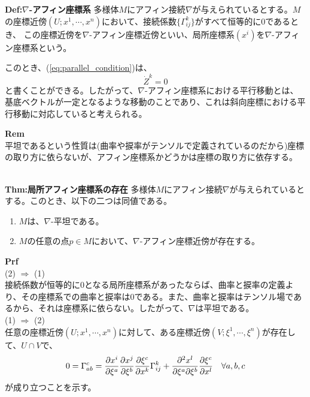 \documentclass[a4paper,11pt]{jsarticle}
\numberwithin{equation}{section}
\begin{document}
\begin{itembox}[l]{\textbf{Def:$\nabla$-アフィン座標系}}
    多様体$M$にアフィン接続$\nabla$が与えられているとする。$M$の座標近傍$(U;x^1,\cdots,x^n)$において、接続係数$\{\Gamma_{ij}^k\}$がすべて恒等的に0であるとき、
    この座標近傍を$\nabla$-アフィン座標近傍といい、局所座標系$(x^i)$を$\nabla$-アフィン座標系という。
\end{itembox}
このとき、(\ref{eq:parallel_condition})は、
\begin{equation}
    \dot{Z}^k = 0
\end{equation}
と書くことができる。したがって、$\nabla$-アフィン座標系における平行移動とは、基底ベクトルが一定となるような移動のことであり、これは斜向座標における平行移動に対応していると考えられる。

\textbf{Rem}\\
平坦であるという性質は(曲率や捩率がテンソルで定義されているのだから)座標の取り方に依らないが、アフィン座標系かどうかは座標の取り方に依存する。\\\\

\begin{itembox}[l]{\textbf{Thm:局所アフィン座標系の存在}}
    多様体$M$にアフィン接続$\nabla$が与えられているとする。このとき、以下の二つは同値である。
    \begin{enumerate}
        \item $M$は、$\nabla$-平坦である。
        \item $M$の任意の点$p \in M$において、$\nabla$-アフィン座標近傍が存在する。
    \end{enumerate}
\end{itembox}
\textbf{Prf}\\
(2) $\Rightarrow$ (1)\\
接続係数が恒等的に0となる局所座標系があったならば、曲率と捩率の定義より、その座標系での曲率と捩率は0である。また、曲率と捩率はテンソル場であるから、それは座標系に依らない。したがって、$\nabla$は平坦である。\\
(1) $\Rightarrow$ (2)\\
任意の座標近傍$(U;x^1,\cdots,x^n)$に対して、ある座標近傍$(V;\xi^1,\cdots,\xi^n)$が存在して、$U \cap V$で、
\begin{equation}
    \label{eq:affine_coordinate}
    0=\Gamma_{ab}^c = \pdv{x^i}{\xi^a}\pdv{x^j}{\xi^b}\pdv{\xi^c}{x^k}\Gamma_{ij}^k + \pdv[2]{x^l}{\xi^a}{\xi^b}\pdv{\xi^c}{x^l} \quad \forall a,b,c
\end{equation}
が成り立つことを示す。\\
\end{document}
